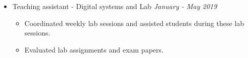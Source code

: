 \documentclass[a4paper,11pt]{article}
\newcommand{\isep}{-2 pt}
\newcommand{\lsep}{-0.5cm}
\newcommand{\spsep}{-0.75cm}
\newcommand{\resheading}[1]{{\large {\begin{minipage}{1\textwidth}{\uppercase{ \textbf{#1}}}\end{minipage}}}}
\begin{document}
\begin{itemize}
	\item Teaching assistant - Digital systems and Lab \hfill \emph{January - May 2019} \\[\spsep]
	\begin{itemize} \itemsep \isep
		\item Coordinated weekly lab sessions and assisted students during these lab sessions. 
		\item Evaluated lab assignments and exam papers.
	\end{itemize}
	
	

\fi

\end{itemize}

\end{document}
